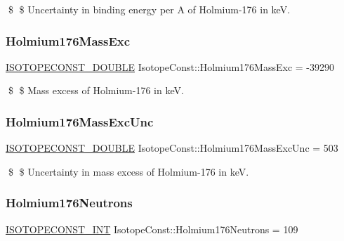 \$ \$ Uncertainty in binding energy per A of Holmium-\/176 in keV. \mbox{\label{group___isotope_const-_holmium-_ho176_ga6d79e63546f7efa18dce615c6081cc24}} 
\subsubsection{\texorpdfstring{Holmium176\+Mass\+Exc}{Holmium176MassExc}}
{\footnotesize\ttfamily \mbox{\hyperlink{group___isotope_const-_macros_ga8f45a7272ce02c0b4c65c44636ed719a}{I\+S\+O\+T\+O\+P\+E\+C\+O\+N\+S\+T\+\_\+\+D\+O\+U\+B\+LE}} Isotope\+Const\+::\+Holmium176\+Mass\+Exc = -\/39290}

\$ \$ Mass excess of Holmium-\/176 in keV. \mbox{\label{group___isotope_const-_holmium-_ho176_ga7e13bc0abddea644a9040772e4cf3daf}} 
\subsubsection{\texorpdfstring{Holmium176\+Mass\+Exc\+Unc}{Holmium176MassExcUnc}}
{\footnotesize\ttfamily \mbox{\hyperlink{group___isotope_const-_macros_ga8f45a7272ce02c0b4c65c44636ed719a}{I\+S\+O\+T\+O\+P\+E\+C\+O\+N\+S\+T\+\_\+\+D\+O\+U\+B\+LE}} Isotope\+Const\+::\+Holmium176\+Mass\+Exc\+Unc = 503}

\$ \$ Uncertainty in mass excess of Holmium-\/176 in keV. \mbox{\label{group___isotope_const-_holmium-_ho176_ga415b1063ea0627bba649a01668f79547}} 
\subsubsection{\texorpdfstring{Holmium176\+Neutrons}{Holmium176Neutrons}}
{\footnotesize\ttfamily \mbox{\hyperlink{group___isotope_const-_macros_ga5f18360b3e99483a35c32d789e62621c}{I\+S\+O\+T\+O\+P\+E\+C\+O\+N\+S\+T\+\_\+\+I\+NT}} Isotope\+Const\+::\+Holmium176\+Neutrons = 109}

